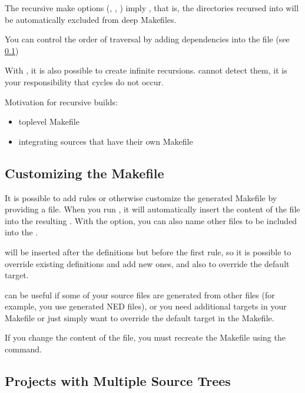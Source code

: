 The recursive make options (, , )
imply , that is, the directories recursed into will be
automatically excluded from deep Makefiles.


You can control the order of traversal by adding dependencies into
the  file (see \ref{sec:makefrag})

\begin{note}
With , it is also possible to create infinite recursions.
 cannot detect them, it is your responsibility that
cycles do not occur.
\end{note}


Motivation for recursive builds:
\begin{itemize}
 \item{toplevel Makefile}
 \item{integrating sources that have their own Makefile}
\end{itemize}


\subsection{Customizing the Makefile}
\label{sec:makefrag}

It is possible to add rules or otherwise customize the generated Makefile
by providing a  file. When you run , it
will automatically insert the content of the  file into the
resulting . With the  option, you can also name other
files to be included into the .

 will be inserted after the definitions but before the first
rule, so it is possible to override existing definitions and add new
ones, and also to override the default target.

 can be useful if some of your source files are generated
from other files (for example, you use generated NED files), or you need
additional targets in your Makefile or just simply want to override the
default target in the Makefile.

\begin{note}
If you change the content of the  file, you must recreate the
Makefile using the  command.
\end{note}

\subsection{Projects with Multiple Source Trees}
\label{sec:build-sim-progs:projects-with-multiple-source-trees}

